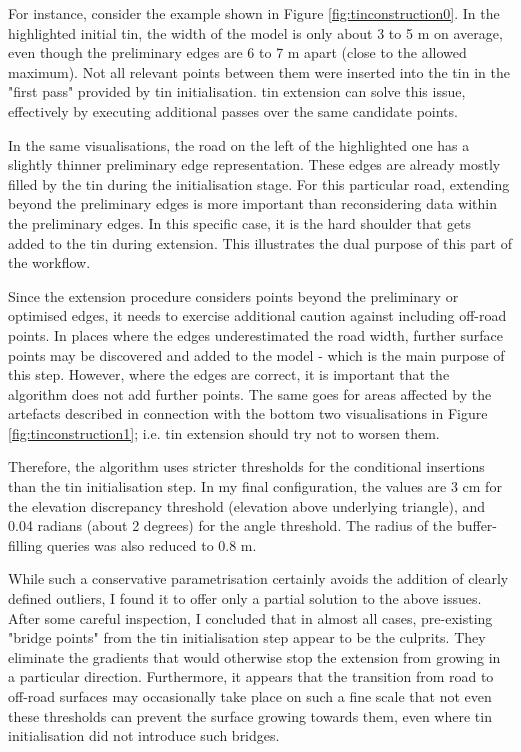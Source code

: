 For instance, consider the example shown in Figure \ref{fig:tinconstruction0}. In the highlighted initial \ac{tin}, the width of the model is only about 3 to 5 m on average, even though the preliminary edges are 6 to 7 m apart (close to the allowed maximum). Not all relevant points between them were inserted into the \ac{tin} in the "first pass" provided by \ac{tin} initialisation. \ac{tin} extension can solve this issue, effectively by executing additional passes over the same candidate points.

In the same visualisations, the road on the left of the highlighted one has a slightly thinner preliminary edge representation. These edges are already mostly filled by the \ac{tin} during the initialisation stage. For this particular road, extending beyond the preliminary edges is more important than reconsidering data within the preliminary edges. In this specific case, it is the hard shoulder that gets added to the \ac{tin} during extension. This illustrates the dual purpose of this part of the workflow.

Since the extension procedure considers points beyond the preliminary or optimised edges, it needs to exercise additional caution against including off-road points. In places where the edges underestimated the road width, further surface points may be discovered and added to the model - which is the main purpose of this step. However, where the edges are correct, it is important that the algorithm does not add further points. The same goes for areas affected by the artefacts described in connection with the bottom two visualisations in Figure \ref{fig:tinconstruction1}; i.e. \ac{tin} extension should try not to worsen them.

Therefore, the algorithm uses stricter thresholds for the conditional insertions than the \ac{tin} initialisation step. In my final configuration, the values are 3 cm for the elevation discrepancy threshold (elevation above underlying triangle), and 0.04 radians (about 2 degrees) for the angle threshold. The radius of the buffer-filling queries was also reduced to 0.8 m.

While such a conservative parametrisation certainly avoids the addition of clearly defined outliers, I found it to offer only a partial solution to the above issues. After some careful inspection, I concluded that in almost all cases, pre-existing "bridge points" from the \ac{tin} initialisation step appear to be the culprits. They eliminate the gradients that would otherwise stop the extension from growing in a particular direction. Furthermore, it appears that the transition from road to off-road surfaces may occasionally take place on such a fine scale that not even these thresholds can prevent the surface growing towards them, even where \ac{tin} initialisation did not introduce such bridges.

